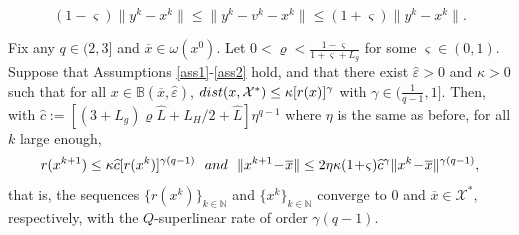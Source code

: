 \documentclass[10pt,a4paper]{amsart}
\begin{document}
 \begin{equation}\label{ykxk-relation}
  (1\!-\!\varsigma)\|y^k-x^k\|\le\|y^k-v^k-x^k\|\le(1\!+\!\varsigma)\|y^k-x^k\|.
 \end{equation}

\begin{theorem}\label{Theorem-Lconverge}
 Fix any $q\in(2,3]$ and $\overline{x}\in\!\omega(x^0)$. Let  $0<\varrho<\!\frac{1-\varsigma}{1+\varsigma+L_g}$ for some $\varsigma\in(0,1)$. Suppose that Assumptions \ref{ass1}-\ref{ass2} hold, and that there exist $\widehat{\varepsilon}>0$ and $\kappa>0$ such that for all $x\in\mathbb{B}(\overline{x},\widehat{\varepsilon})$, ${\rm dist}(x,\mathcal{X}^*)\le\kappa[r(x)]^{\gamma}$ with $\gamma\in(\frac{1}{q-1},1]$. 
  Then, with $\widehat{c}\!:=\![(3+\!L_g)\varrho \widehat{L}\!+\!L_H/2\!+\!\widehat{L}]\eta^{q-1}$ where $\eta$ is the same as before, for all $k$ large enough, 
 \begin{equation}\label{aim-rineq}
 r(x^{k+1})\le \kappa\widehat{c}[r(x^k)]^{\gamma(q-1)}\ \ {\rm and}\ \ 
 \|x^{k+1}\!-\!\overline{x}\|
 \le2\eta\kappa(1\!+\!\varsigma)\widehat{c}^{\gamma}\|x^k\!-\!\overline{x}\|^{\gamma(q-1)},
 \end{equation}
 that is, the sequences $\{r(x^k)\}_{k\in\mathbb{N}}$ and $\{x^k\}_{k\in\mathbb{N}}$ converge to $0$ and $\overline{x}\in\mathcal{X}^*$, respectively, with the $Q$-superlinear rate of order $\gamma(q\!-\!1)$.
\end{theorem}
\end{document}
